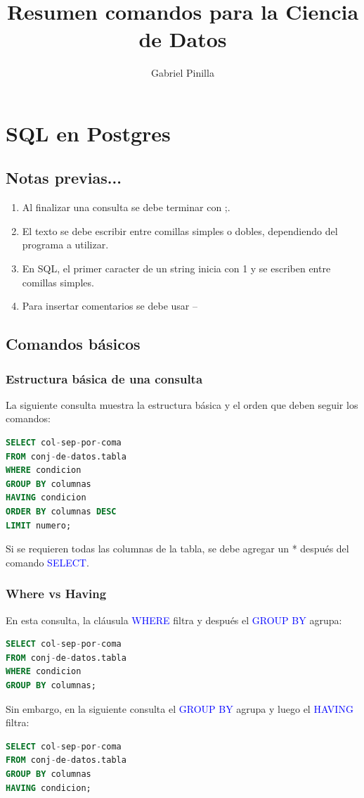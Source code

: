 \documentclass[a4paper, 12pt]{book}
\begin{document}
\author{Gabriel Pinilla}
\title{Resumen comandos para la Ciencia de Datos}


\frontmatter
\maketitle
\tableofcontents %
\mainmatter %

%
\chapter{SQL en Postgres}
\lstset{style=estilosql}
\section{Notas previas...}
\begin{enumerate}
	\item Al finalizar una consulta se debe terminar con ;.
	\item El texto se debe escribir entre comillas simples o dobles, dependiendo del programa a utilizar.
	\item En SQL, el primer caracter de un string inicia con 1 y se escriben entre comillas simples.
	\item Para insertar comentarios se debe usar --
\end{enumerate}
\section{Comandos básicos}
\subsection{Estructura básica de una consulta}
La siguiente consulta muestra la estructura básica y el orden que deben seguir los comandos:
\begin{lstlisting}[language=SQL]
SELECT col-sep-por-coma
FROM conj-de-datos.tabla
WHERE condicion
GROUP BY columnas
HAVING condicion
ORDER BY columnas DESC
LIMIT numero;
\end{lstlisting}
Si se requieren todas las columnas de la tabla, se debe agregar un * después del comando \textcolor{blue}{SELECT}.
\subsection{Where vs Having}
En esta consulta, la cláusula \textcolor{blue}{WHERE} filtra y después el \textcolor{blue}{GROUP BY} agrupa:
\begin{lstlisting}[language=SQL]
SELECT col-sep-por-coma
FROM conj-de-datos.tabla
WHERE condicion
GROUP BY columnas;
\end{lstlisting}
Sin embargo, en la siguiente consulta el \textcolor{blue}{GROUP BY} agrupa y luego el \textcolor{blue}{HAVING} filtra:
\begin{lstlisting}[language=SQL]
SELECT col-sep-por-coma
FROM conj-de-datos.tabla
GROUP BY columnas
HAVING condicion;
\end{lstlisting}
\end{document}
